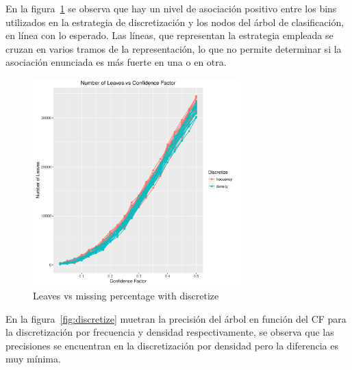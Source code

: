 En la figura~\ref{fig:6d} se observa que hay un nivel de asociación positivo entre los bins
utilizados en la estrategia de discretización y los nodos del árbol de clasificación, en línea
con lo esperado. Las líneas, que representan la estrategia empleada se cruzan en varios
tramos de la representación, lo que no permite determinar si la asociación enunciada es
más fuerte en una o en otra.

\begin{figure}
  \centering
  \includegraphics[width = 8cm]{6d.pdf}
  \caption{Leaves vs missing percentage with discretize}
  \label{fig:6d}
\end{figure}

En la figura~\ref{fig:discretize} muetran la precisión del árbol en función del CF para la discretización por frecuencia y densidad respectivamente, se observa que las precisiones se encuentran en la discretización por densidad pero la diferencia es muy mínima.


